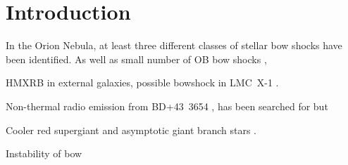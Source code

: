 
\section{Introduction}
\label{sec:introduction}

In the Orion Nebula, at least three different classes of stellar bow
shocks have been identified. As well as small number of OB bow shocks \citep{Smith:2005a, ODell:2001c}, 

HMXRB in external galaxies, possible bowshock in LMC~X-1 \citep{Hyde:2017a}.

Non-thermal radio emission from BD+43~3654 \citep{Benaglia:2010a}, has
been searched for but

Cooler red supergiant and asymptotic giant branch stars
\citep{Ueta:2008a, Sahai:2010a, Cox:2012a}. 

Instability of bow \citep{Blondin:1988a}

